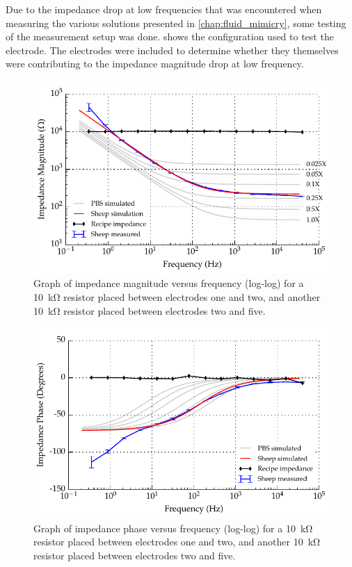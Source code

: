 Due to the impedance drop at low frequencies that was encountered when measuring the various solutions presented in \cref{chap:fluid_mimicry}, some testing of the measurement setup was done.
 shows the configuration used to test the electrode.
The electrodes were included to determine whether they themselves were contributing to the impedance magnitude drop at low frequency.


\begin{figure}
    \centering
    \includegraphics{content/appendices/Solution-Impedance-Measurements/graphics/run14_calibration_10k_noWater_ZVsF_graph_mag}
    \caption{\label{fig:calibration_10kRes_mag}Graph of impedance magnitude versus frequency (log-log) for a \SI{10}{\kilo\ohm} resistor placed between electrodes one and two, and another \SI{10}{\kilo\ohm} resistor placed between electrodes two and five.}
\end{figure}

\begin{figure}
    \centering
    \includegraphics{content/appendices/Solution-Impedance-Measurements/graphics/run14_calibration_10k_noWater_ZVsF_graph_phase}
    \caption{\label{fig:calibration_10kRes_phase}Graph of impedance phase versus frequency (log-log) for a \SI{10}{\kilo\ohm} resistor placed between electrodes one and two, and another \SI{10}{\kilo\ohm} resistor placed between electrodes two and five.}
\end{figure}

